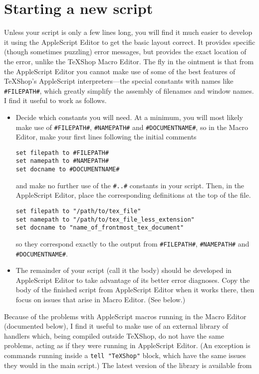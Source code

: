 \documentclass[11pt]{amsart}
\def\TeXShop{\TeX Shop\xspace}
\begin{document}
\section{Starting a new script}
Unless your script is only a few lines long, you will find it much easier to develop it using the AppleScript Editor to get the basic layout correct. It provides specific (though sometimes puzzling) error messages, but provides the exact location of the error, unlike  the \TeXShop Macro Editor. The fly in the ointment is that from the AppleScript Editor you cannot make use of some of the best features of \TeXShop's AppleScript interpreters---the special constants with names like \verb|#FILEPATH#|, which greatly simplify the assembly of filenames and window names. I find it useful to work as follows. 
\begin{itemize}
\item
Decide which constants you will need. At  a minimum, you will most likely make use of \verb|#FILEPATH#|, \verb|#NAMEPATH#| and \verb|#DOCUMENTNAME#|, so in the Macro Editor, make your first lines following the initial comments 
\begin{verbatim}
set filepath to #FILEPATH#
set namepath to #NAMEPATH#
set docname to #DOCUMENTNAME#
\end{verbatim}
and make no further use of the \verb|#..#| constants in your script. Then, in the AppleScript Editor, place the corresponding definitions at the top of the file.
\begin{verbatim}
set filepath to "/path/to/tex_file"
set namepath to "/path/to/tex_file_less_extension"
set docname to "name_of_frontmost_tex_document"
\end{verbatim}
so they correspond exactly to the output from \verb|#FILEPATH#|, \verb|#NAMEPATH#| and \verb|#DOCUMENTNAME#|. 
\item
The remainder of your script (call it the body) should be developed in AppleScript Editor to take advantage of its better error diagnoses. Copy the body of the finished script from AppleScript Editor when it works there, then focus on issues that arise in Macro Editor. (See below.)
\end{itemize}
Because of the problems with AppleScript macros running in the Macro Editor (documented below), I find it useful to make use of an external library of handlers which, being compiled outside \TeXShop, do not have the same problems, acting as if they were running in AppleScript Editor. (An exception is commands running inside a {\tt tell "TeXShop"} block, which have the same issues they would in the main script.) The latest version of the library is available from
\end{document}
